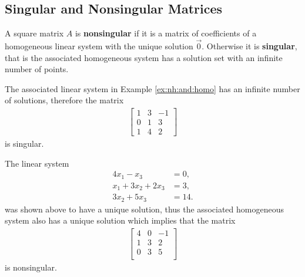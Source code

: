 \subsection{Singular and Nonsingular Matrices}

\begin{definition}
A square matrix $A$ is \textbf{nonsingular} if it is a matrix of coefficients of a homogeneous linear system with the unique solution $\vec{0}$.  Otherwise it is \textbf{singular}, that is the associated homogeneous system has a solution set with an infinite number of points.
\end{definition}


\begin{example}
The associated linear system in Example \ref{ex:nh:and:homo} has an infinite number of solutions, therefore the matrix
%
\begin{align*}
\begin{bmatrix}
1 & 3 & -1 \\
0 & 1 & 3 \\
1 & 4 & 2
\end{bmatrix}
\end{align*}
is singular.

The linear system
%
\begin{align*}
4x_1 - x_3 & = 0, \\
x_1+3x_2 +2x_3 & = 3, \\
3x_2 + 5x_3 & = 14.
\end{align*}
was shown above to have a unique solution, thus the associated homogeneous system also has a unique solution which implies that the matrix
%
\begin{align*}
\begin{bmatrix}
4 & 0 & -1 \\
1 & 3 & 2  \\
0 & 3 & 5  \\
\end{bmatrix}
\end{align*}
is nonsingular.

\end{example}

\phantom{hi}

